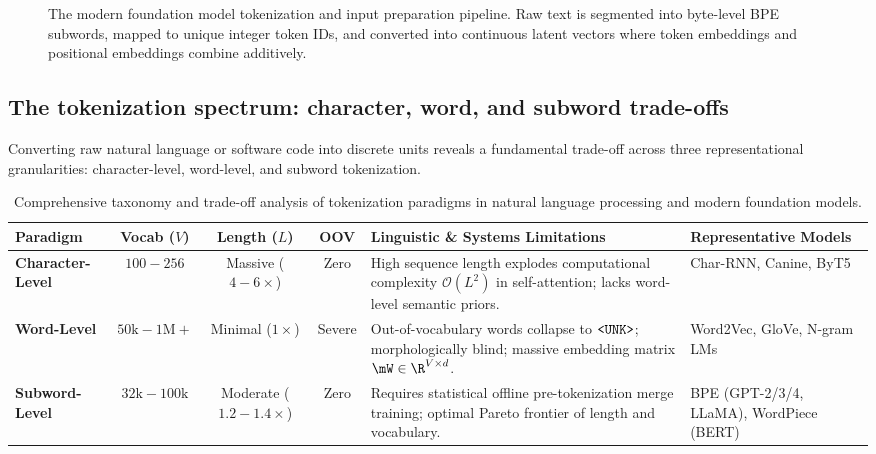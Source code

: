 \documentclass[../../main.tex]{subfiles}
\begin{document}
\begin{figure}[htbp]
\caption{The modern foundation model tokenization and input preparation pipeline. Raw text is segmented into byte-level BPE subwords, mapped to unique integer token IDs, and converted into continuous latent vectors where token embeddings and positional embeddings combine additively.}
\label{fig:modern_tokenization_pipeline}
\end{figure}

\subsection{The tokenization spectrum: character, word, and subword trade-offs}
\label{subsec:tokenization_spectrum}

Converting raw natural language or software code into discrete units reveals a fundamental trade-off across three representational granularities: character-level, word-level, and subword tokenization.

\begin{table}[htbp]
\centering
\footnotesize
\caption{Comprehensive taxonomy and trade-off analysis of tokenization paradigms in natural language processing and modern foundation models.}
\label{tab:tokenization_tradeoffs}
\begin{tabularx}{\textwidth}{l c c c >{\raggedright\arraybackslash}X >{\raggedright\arraybackslash}p{2.6cm}}
\toprule
\textbf{Paradigm} & \textbf{Vocab ($V$)} & \textbf{Length ($L$)} & \textbf{OOV} & \textbf{Linguistic \& Systems Limitations} & \textbf{Representative Models} \\
\midrule
\textbf{Character-Level} & $100 - 256$ & Massive ($4-6\times$) & Zero & High sequence length explodes computational complexity $\mathcal{O}(L^2)$ in self-attention; lacks word-level semantic priors. & Char-RNN, Canine, ByT5 \\
\addlinespace[3pt]
\textbf{Word-Level} & $50\text{k} - 1\text{M}+$ & Minimal ($1\times$) & Severe & Out-of-vocabulary words collapse to $\text{\texttt{<UNK>}}$; morphologically blind; massive embedding matrix $\mW \in \R^{V \times d}$. & Word2Vec, GloVe, N-gram LMs \\
\addlinespace[3pt]
\textbf{Subword-Level} & $32\text{k} - 100\text{k}$ & Moderate ($1.2-1.4\times$) & Zero & Requires statistical offline pre-tokenization merge training; optimal Pareto frontier of length and vocabulary. & BPE (GPT-2/3/4, LLaMA), WordPiece (BERT) \\
\bottomrule
\end{tabularx}
\end{table}
\end{document}
